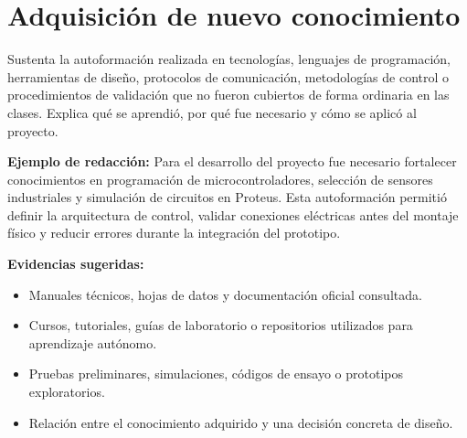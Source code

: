 \documentclass[12pt,letterpaper]{report}
\begin{document}
\section{Adquisición de nuevo conocimiento}
\begin{instrucciones}
Sustenta la autoformación realizada en tecnologías, lenguajes de programación, herramientas de diseño, protocolos de comunicación, metodologías de control o procedimientos de validación que no fueron cubiertos de forma ordinaria en las clases. Explica qué se aprendió, por qué fue necesario y cómo se aplicó al proyecto.

\vspace{2mm}
\noindent \textbf{Ejemplo de redacción:} Para el desarrollo del proyecto fue necesario fortalecer conocimientos en programación de microcontroladores, selección de sensores industriales y simulación de circuitos en Proteus. Esta autoformación permitió definir la arquitectura de control, validar conexiones eléctricas antes del montaje físico y reducir errores durante la integración del prototipo.

\vspace{2mm}
\noindent \textbf{Evidencias sugeridas:}
\begin{itemize}
  \item Manuales técnicos, hojas de datos y documentación oficial consultada.
  \item Cursos, tutoriales, guías de laboratorio o repositorios utilizados para aprendizaje autónomo.
  \item Pruebas preliminares, simulaciones, códigos de ensayo o prototipos exploratorios.
  \item Relación entre el conocimiento adquirido y una decisión concreta de diseño.
\end{itemize}
\end{instrucciones}
\end{document}
